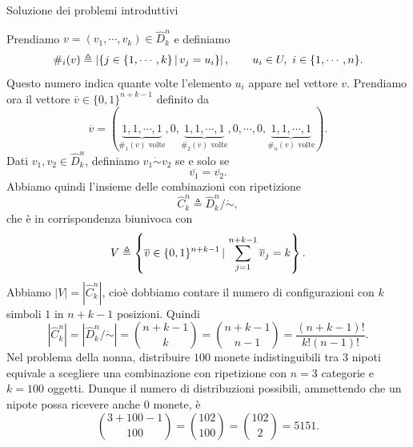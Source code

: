 \documentclass[a4paper]{article}
\begin{document}
\begin{snippetsolution}{Soluzione dei problemi introduttivi}
\begin{enumerate}
            Prendiamo \(v=(v_1,\cdots,v_k)\in \hat D_k^n\) e definiamo
            \[
                \#_i(v)
                \triangleq
                \left|
                \left\{
                    j\in\{1,\cdots,k\}\,|\, v_j=u_i
                \right\}
                \right|,
                \qquad
                u_i\in U,\ i\in\{1,\cdots,n\}.
            \]
            Questo numero indica quante volte l'elemento \(u_i\) appare nel vettore \(v\).
            Prendiamo ora il vettore \(\overline v\in\{0,1\}^{n+k-1}\) definito da
            \[
                \overline v
                =
                \left(
                    \underbrace{1,1,\cdots,1}_{\#_1(v)\text{ volte}},
                    0,
                    \underbrace{1,1,\cdots,1}_{\#_2(v)\text{ volte}},
                    0,
                    \cdots,
                    0,
                    \underbrace{1,1,\cdots,1}_{\#_n(v)\text{ volte}}
                \right).
            \]
            Dati \(v_1,v_2\in\hat D_k^n\), definiamo \(v_1\dot\sim v_2\) se e solo se
            \[
                \overline{v_1}=\overline{v_2}.
            \]
            Abbiamo quindi l'insieme delle combinazioni con ripetizione
            \[
                \hat C_k^n
                \triangleq
                \hat D_k^n/{\dot\sim},
            \]
            che è in corrispondenza biunivoca con
            \[
                V
                \triangleq
                \left\{
                    \overline v\in\{0,1\}^{n+k-1}
                    \,|\,
                    \sum_{j=1}^{n+k-1}\overline v_j=k
                \right\}.
            \]
            Abbiamo \(|V|=|\hat C_k^n|\), cioè dobbiamo contare il numero di configurazioni con \(k\) simboli \(1\) in \(n+k-1\) posizioni.
            Quindi
            \[
                |\hat C_k^n|
                =
                \left|\hat D_k^n/{\dot\sim}\right|
                =
                \binom{n+k-1}{k}
                =
                \binom{n+k-1}{n-1}
                =
                \frac{(n+k-1)!}{k!(n-1)!}.
            \]
            Nel problema della nonna, distribuire \(100\) monete indistinguibili tra \(3\) nipoti equivale a scegliere una combinazione con ripetizione con \(n=3\) categorie e \(k=100\) oggetti.
            Dunque il numero di distribuzioni possibili, ammettendo che un nipote possa ricevere anche \(0\) monete, è
            \[
                \binom{3+100-1}{100}
                =
                \binom{102}{100}
                =
                \binom{102}{2}
                =
                5151.
            \]
    \end{enumerate}
\end{snippetsolution}
\end{document}
